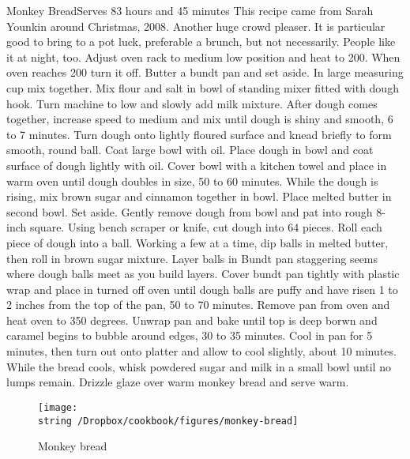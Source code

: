 \begin{recipe}{Monkey Bread}{Serves 8}{3 hours and 45 minutes}
\freeform This recipe came from Sarah Younkin around Christmas, 2008.  Another huge crowd pleaser.  It is particular good to bring to a pot luck, preferable a brunch, but not necessarily.  People like it at night, too.
\newstep
Adjust oven rack to medium low position and heat to 200\0.  When oven reaches 200\0 turn it off.
Butter a bundt pan and set aside.
In large measuring cup mix together.
Mix flour and salt in bowl of standing mixer fitted with dough hook.
\newstep
Turn machine to low and slowly add milk mixture.  After dough comes together, increase speed to medium and mix until dough is shiny and smooth, 6 to 7 minutes. Turn dough onto lightly floured surface and knead briefly to form smooth, round ball. Coat large bowl with oil. Place dough in bowl and coat surface of dough lightly with oil. Cover bowl with a kitchen towel and place in warm oven until dough doubles in size, 50 to 60 minutes.
While the dough is rising, mix brown sugar and cinnamon together in bowl. Place melted butter in second bowl. Set aside.
\newstep
Gently remove dough from bowl and pat into rough 8-inch square. Using bench scraper or knife, cut dough into 64 pieces.
\newstep
Roll each piece of dough into a ball. Working a few at a time, dip balls in melted butter, then roll in brown sugar mixture. Layer balls in Bundt pan staggering seems where dough balls meet as you build layers.
\newstep
Cover bundt pan tightly with plastic wrap and place in turned off oven until dough balls are puffy and have risen 1 to 2 inches from the top of the pan, 50 to 70 minutes.
\newstep
Remove pan from oven and heat oven to 350 degrees. Unwrap pan and bake until top is deep borwn and caramel begins to bubble around edges, 30 to 35 minutes. Cool in pan for 5 minutes, then turn out onto platter and allow to cool slightly, about 10 minutes.
While the bread cools, whisk powdered sugar and milk in a small bowl until no lumps remain. Drizzle glaze over warm monkey bread and serve warm. 
\end{recipe}
\begin{figure}
\begin{center}
\texttt{[image: \\string~/Dropbox/cookbook/figures/monkey-bread]}
\end{center}
\caption*{Monkey bread}
\end{figure}
\clearpage
